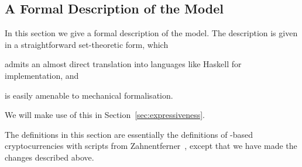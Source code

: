 \subsection{A Formal Description of the \EUTXO{} Model}
\label{section:eutxo-spec}

In this section we give a formal description of the \EUTXO{} model.  The
description is given in a straightforward set-theoretic form, which
\begin{inparaenum}[(1)]
\item admits an almost direct translation into languages like Haskell for implementation, and
\item is easily amenable to mechanical formalisation.
\end{inparaenum}
We will make use of this in Section~\ref{sec:expressiveness}.

The definitions in this section are essentially the definitions of
\UTXO{}-based cryptocurrencies with scripts from
Zahnentferner~\cite{Zahnentferner18-UTxO}, except that we have made the changes
described above.

